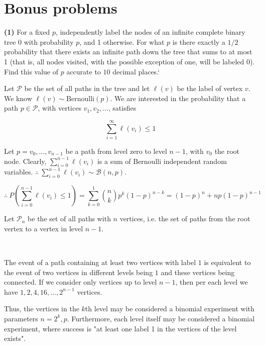 \documentclass[a4paper, 12pt]{article}
\begin{document}
\pagebreak 

\section{Bonus problems}

\begin{myframe}
\textbf{(1)} For a fixed $p$, independently label the nodes of an infinite
complete binary tree $0$ with probability $p$, and 1 otherwise. For what $p$ is
there exactly a $1/2$ probability that there exists an infinite path down the tree
that sums to at most 1 (that is, all nodes visited, with the possible exception
of one, will be labeled 0). Find this value of $p$ accurate to $10$ decimal places.`
\end{myframe}

Let $\mathcal{P}$ be the set of all paths in the tree and let $\ell(v)$ be the
label of vertex $v$. We know $\ell(v) \sim \text{Bernoulli}(p)$. We are
interested in the probability that a path
$p \in \mathcal{P}$, with vertices $v_1, v_2, \ldots$, satisfies 

\begin{equation*}
  \sum_{i=1}^\infty \ell(v_i) \leq 1
\end{equation*}

Let $p = v_0, \ldots, v_{n-1}$ be a path from level zero to level $n-1$, with
$v_0$ the root node. Clearly, $\sum_{i=0}^{n-1} \ell(v_i)$ is a sum of Bernoulli
independent random variables. $\therefore ~ \sum_{i=0}^{n-1} \ell(v_i) \sim
\mathcal{B}(n, p)$.

\begin{equation*}
  \therefore ~ P\left( \sum_{i = 0}^{n-1} \ell(v_i) \leq 1 \right) =
  \sum_{k=0}^1 \binom{n}{k}p^k(1-p)^{n-k} = (1-p)^{n} + np(1-p)^{n-1}
\end{equation*}

Let $\mathcal{P}_n$ be the set of all paths with $n$ vertices, i.e. the set of
paths from the root vertex to a vertex in level $n - 1$.

~ 

The event of a path containing at least two vertices with label $1$ is
equivalent to the event of two vertices in different levels being $1$ and these
vertices being connected. If we consider only vertices up to level $n-1$, then
per each level we have $1, 2, 4, 16, \ldots, 2^{n-1}$ vertices. 

Thus, the vertices in the $k$th level may be considered a binomial experiment
with parameters $n = 2^{k}, p$. Furthermore, each level itself may be considered
a binomial experiment, where success is "at least one label 1 in the vertices of
the level exists".
\end{document}
